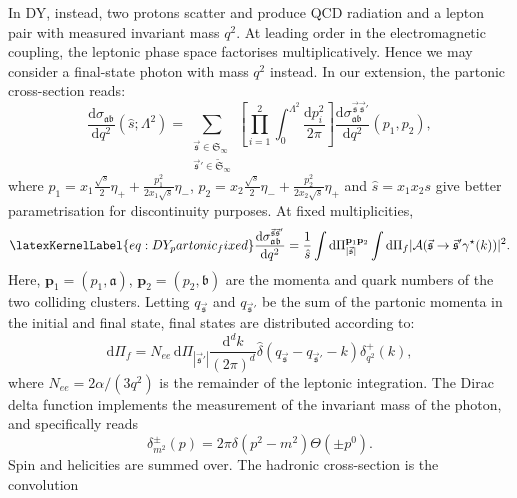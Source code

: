 \documentclass[%
 reprint,
 amsmath,amssymb,
 superscriptaddress,
 aps,
 preprintnumbers,
prl,
floatfix,
]{revtex4-2}
\let\label\latexKernelLabel
\begin{document}
In DY, instead, two protons scatter and produce QCD radiation and a lepton pair with measured invariant mass $q^2$.
At leading order in the electromagnetic coupling, the leptonic phase space factorises multiplicatively.
Hence we may consider a final-state photon with mass $q^2$ instead.
In our extension, the partonic cross-section reads:
\begin{equation}
\frac{\mathrm{d}\sigma_{\mathfrak{a}\mathfrak{b}}}{\mathrm{d}q^2}(\hat{s};\Lambda^2)= \! \sum_{\substack{\vec{\mathfrak{s}}\in\mathfrak{S}_{\infty} \\ \vec{\mathfrak{s}}'\in\tilde{\mathfrak{S}}_{\infty} }}\left[\prod_{i=1}^2\int_0^{\Lambda^2}\frac{\mathrm{d}p_i^2}{2\pi}\right]\frac{\mathrm{d}\sigma^{\vec{\mathfrak{s}}\vec{\mathfrak{s}}'}_{\mathfrak{a}\mathfrak{b}}}{\mathrm{d}q^2}(p_1,p_2),
\end{equation}
where $p_1=x_1\frac{\sqrt{s}}{2}\eta_++\frac{p_1^2}{2x_1\sqrt{s}}\eta_-$, $p_2=x_2\frac{\sqrt{s}}{2}\eta_-+\frac{p_2^2}{2x_2\sqrt{s}}\eta_+$ and $\hat{s}=x_1 x_2 s$ {\color{red} give better parametrisation for discontinuity purposes}.
At fixed multiplicities,
\begin{equation}
\label{eq:DY_partonic_fixed}
\frac{\mathrm{d}\sigma^{\vec{\mathfrak{s}}\vec{\mathfrak{s}}'}_{\mathfrak{a}\mathfrak{b}}}{\mathrm{d}q^2}=\frac{1}{\hat{s}}\int \mathrm{d}\Pi_{|\vec{\mathfrak{s}}|}^{\mathbf{p}_1\mathbf{p}_2}\int \mathrm{d}\Pi_f |\mathcal{A}(\vec{\mathfrak{s}}  \rightarrow \vec{\mathfrak{s}}' \gamma^\star(k))|^2.
\end{equation}
Here, $\mathbf{p}_1=(p_1,\mathfrak{a})$, $\mathbf{p}_2=(p_2,\mathfrak{b})$ are the momenta and quark numbers of the two colliding clusters.
Letting $q_{\vec{\mathfrak{s}}}$ and $q_{\vec{\mathfrak{s}}'}$ be the sum of the partonic momenta in the initial and final state, final states are distributed according to:
\begin{equation}
\mathrm{d}\Pi_f= N_{ee} \, \mathrm{d}\Pi_{|\vec{\mathfrak{s}}'|} \frac{\mathrm{d}^d k}{(2\pi)^d}\hat{\delta}(q_{\vec{\mathfrak{s}}}-q_{\vec{\mathfrak{s}}'}-k)\delta^+_{q^2}(k),
\end{equation}
 where $N_{ee}=2\alpha/(3 q^2)$ is the remainder of the leptonic integration.
 The Dirac delta function implements the measurement of the invariant mass of the photon, and specifically reads
\begin{equation}
\delta^\pm_{m^2}(p)=2\pi  \delta\left (p^2-m^2\right)\Theta(\pm p^0).
\end{equation}
Spin and helicities are summed over.
The hadronic cross-section is the convolution
\end{document}
